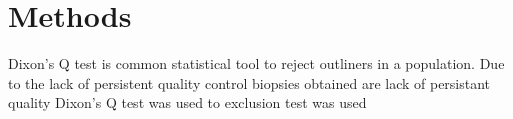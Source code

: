 \chapter{Methods}

Dixon's Q test is common statistical tool to reject outliners in a population. Due to the lack of persistent quality control  biopsies obtained are lack of persistant quality Dixon's Q test was used to   exclusion test was used 
